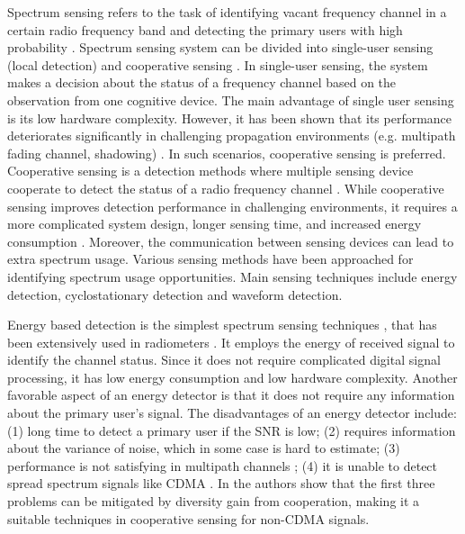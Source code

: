 Spectrum sensing refers to the task of identifying vacant frequency channel in a certain radio frequency band and detecting the primary users with high probability \cite{umar2012spectrum}. 
Spectrum sensing system can be divided into single-user sensing (local detection) and cooperative sensing \cite{wang2011advances, akyildiz2011cooperative, ma2008soft, axell2010overview}. In single-user sensing, the system makes a decision about the status of a frequency channel based on the observation from one cognitive device. The main advantage of single user sensing is its low hardware complexity. However, it has been shown that its performance deteriorates significantly in challenging propagation environments (e.g. multipath fading channel, shadowing) \cite{akyildiz2011cooperative}. In such scenarios, cooperative sensing is preferred. Cooperative sensing is a detection methods where multiple sensing device cooperate to detect the status of a radio frequency channel \cite{ganesan2005cooperative, arslan2007cognitive}. While cooperative sensing improves detection performance in challenging environments, it requires a more complicated system design,  longer sensing time,  and increased energy consumption \cite{akyildiz2011cooperative}.  
Moreover, the communication between sensing devices can lead to extra spectrum usage. 
Various sensing methods have been approached for identifying spectrum usage opportunities. Main sensing techniques include  energy detection, cyclostationary detection and waveform detection. 

Energy based detection is the simplest spectrum sensing techniques , that has been extensively used in radiometers \cite{cabric2004implementation, poor1994introduction, urkowitz1967energy}. It employs the energy of received signal to identify the channel status. Since it does not require complicated digital signal processing, it has low energy consumption and low hardware complexity.  Another favorable aspect of an energy detector is that it does not require  any information about the primary user's signal.  
The disadvantages of an energy detector include: (1)  long time to detect a  primary user if the SNR is low; (2) requires information about the variance of noise, which in some case is hard to estimate; (3) performance is not satisfying in multipath channels \cite{akyildiz2011cooperative}; (4) it is unable to detect spread spectrum signals like CDMA \cite{urkowitz1967energy, akyildiz2011cooperative}. 
In \cite{akyildiz2011cooperative} the authors show that the first three problems can be mitigated by diversity gain from cooperation,  making it a suitable techniques in cooperative sensing for non-CDMA signals.  

